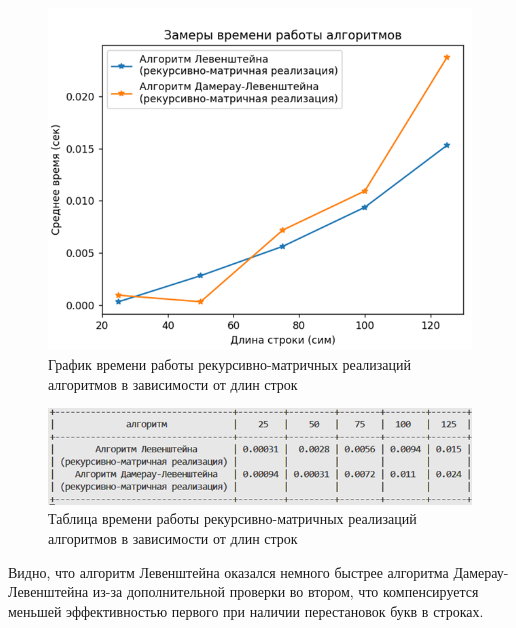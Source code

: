 \begin{figure}[H]
    \centering
    \includegraphics[width=1\textwidth]{img/graph_rec-mat.png}
    \caption{График времени работы рекурсивно-матричных реализаций алгоритмов в зависимости от длин строк}
\end{figure}
\begin{figure}[H]
    \centering
    \includegraphics[width=1\textwidth]{img/table_rec-mat.png}
    \caption{Таблица времени работы рекурсивно-матричных реализаций алгоритмов в зависимости от длин строк}
\end{figure}

Видно, что алгоритм Левенштейна оказался немного быстрее алгоритма Дамерау-Левенштейна из-за дополнительной проверки во втором, что компенсируется меньшей эффективностью первого при наличии перестановок букв в строках.

